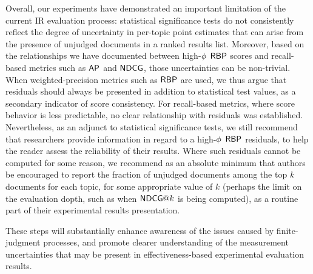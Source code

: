 Overall, our experiments have demonstrated an important limitation of
the current IR evaluation process: statistical significance tests do
not consistently reflect the degree of uncertainty in per-topic point
estimates that can arise from the presence of unjudged documents in a
ranked results list.
Moreover, based on the relationships we have documented between
high-$\mbox{$\phi$}$ ${\mbox{\sf{RBP}}}$ scores and recall-based metrics such as ${\mbox{\sf{AP}}}$ and
${\mbox{\sf{NDCG}}}$, those uncertainties can be non-trivial.
When weighted-precision metrics such as ${\mbox{\sf{RBP}}}$ are used, we thus
argue that residuals should always be presented in addition to
statistical test values, as a secondary indicator of score
consistency.
For recall-based metrics, where score behavior is less predictable,
no clear relationship with residuals was established.
Nevertheless, as an adjunct to statistical significance tests, we
still recommend that researchers provide information in regard to a
high-$\mbox{$\phi$}$ ${\mbox{\sf{RBP}}}$ residuals, to help the reader assess the
reliability of their results.
Where such residuals cannot be computed for some reason, we recommend
as an absolute minimum that authors be encouraged to report the
fraction of unjudged documents among the top $k$ documents for each
topic, for some appropriate value of $k$ (perhaps the limit on the
evaluation dopth, such as when $\ndcg@k$ is being computed), as a
routine part of their experimental results presentation.

These steps will substantially enhance awareness of the issues
caused by finite-judgment processes, and promote clearer
understanding of the measurement uncertainties that may be present in
effectiveness-based experimental evaluation results.
